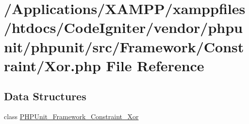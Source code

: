 \hypertarget{_xor_8php}{}\section{/\+Applications/\+X\+A\+M\+P\+P/xamppfiles/htdocs/\+Code\+Igniter/vendor/phpunit/phpunit/src/\+Framework/\+Constraint/\+Xor.php File Reference}
\label{_xor_8php}
\subsection*{Data Structures}
\begin{DoxyCompactItemize}
\item 
class \mbox{\hyperlink{class_p_h_p_unit___framework___constraint___xor}{P\+H\+P\+Unit\+\_\+\+Framework\+\_\+\+Constraint\+\_\+\+Xor}}
\end{DoxyCompactItemize}
